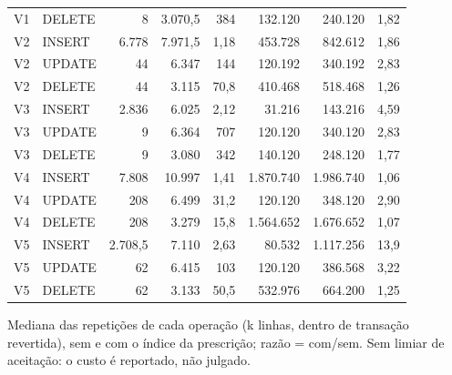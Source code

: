 {\begin{tabular}{llrrrrrr}
V1 & DELETE & 8 & 3.070,5 & 384 & 132.120 & 240.120 & 1,82 \\
V2 & INSERT & 6.778 & 7.971,5 & 1,18 & 453.728 & 842.612 & 1,86 \\
V2 & UPDATE & 44 & 6.347 & 144 & 120.192 & 340.192 & 2,83 \\
V2 & DELETE & 44 & 3.115 & 70,8 & 410.468 & 518.468 & 1,26 \\
V3 & INSERT & 2.836 & 6.025 & 2,12 & 31.216 & 143.216 & 4,59 \\
V3 & UPDATE & 9 & 6.364 & 707 & 120.120 & 340.120 & 2,83 \\
V3 & DELETE & 9 & 3.080 & 342 & 140.120 & 248.120 & 1,77 \\
V4 & INSERT & 7.808 & 10.997 & 1,41 & 1.870.740 & 1.986.740 & 1,06 \\
V4 & UPDATE & 208 & 6.499 & 31,2 & 120.120 & 348.120 & 2,90 \\
V4 & DELETE & 208 & 3.279 & 15,8 & 1.564.652 & 1.676.652 & 1,07 \\
V5 & INSERT & 2.708,5 & 7.110 & 2,63 & 80.532 & 1.117.256 & 13,9 \\
V5 & UPDATE & 62 & 6.415 & 103 & 120.120 & 386.568 & 3,22 \\
V5 & DELETE & 62 & 3.133 & 50,5 & 532.976 & 664.200 & 1,25 \\
\bottomrule
\end{tabular}\par
\vspace{3pt}
\begin{minipage}{\linewidth}\footnotesize
Mediana das repetições de cada operação (k linhas, dentro de transação revertida), sem e com o índice da prescrição; razão = com/sem. Sem limiar de aceitação: o custo é reportado, não julgado.
\end{minipage}
}
